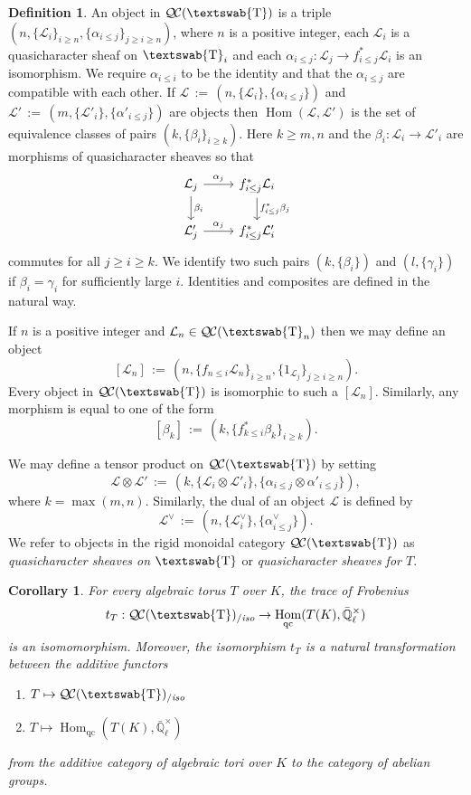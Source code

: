 \documentclass[11pt]{amsart}
\newcommand{\mathswab}[1]{\operatorname{\textswab{#1}}}
\theoremstyle{plain}
\newtheorem{corollary}[theorem]{Corollary}
\theoremstyle{definition}
\newtheorem{definition}[theorem]{Definition}
\theoremstyle{remark}
\newcommand{\EE}{\mathbb{\bar Q}_\ell}
\newcommand{\EEx}{\EE^\times}
\DeclareMathOperator{\Hom}{Hom}
\newcommand{\ceq}{{\, :=\, }}
\newcommand{\GN}[1]{\mathswab{#1}}
\newcommand{\qcs}[1]{{\mathcal{#1}}}
\newcommand{\QC}{{\mathcal{Q\hskip-0.8pt C}}}
\newcommand{\QCiso}[1]{\QC(#1)_{/\textit{iso}}}
\newcommand{\trFrob}[1]{t_{#1}}
\begin{document}
\begin{definition}\label{def:catGN}
An object in $\QC(\GN{T})$ is a triple $(n, \{\qcs{L}_i\}_{i \ge n}, \{\alpha_{i \le j}\}_{j \ge i \ge n})$, where $n$
is a positive integer, each $\qcs{L}_i$ is a quasicharacter sheaf on $\GN{T}_i$ and each
$\alpha_{i \le j} : \qcs{L}_j \to f^*_{i \le j} \qcs{L}_i$ is an isomorphism.  We require $\alpha_{i \le i}$ to be
the identity and that the $\alpha_{i \le j}$ are compatible with each other.  If $\qcs{L} \ceq (n, \{\qcs{L}_i\}, \{\alpha_{i \le j}\})$
and $\qcs{L}' \ceq (m, \{\qcs{L}'_i\}, \{\alpha'_{i \le j}\})$ are objects then $\Hom(\qcs{L}, \qcs{L}')$ is the set
of equivalence classes of pairs $(k, \{\beta_i\}_{i \ge k})$.  Here $k \ge m, n$ and the $\beta_i : \qcs{L}_i \to \qcs{L}'_i$ are
morphisms of quasicharacter sheaves so that
\[
\begin{tikzcd}
\qcs{L}_j \rar{\alpha_j} \dar{\beta_i} & f^*_{i \le j} \qcs{L}_i \dar{f_{i \le j}^*\beta_j} \\
\qcs{L}'_j \rar{\alpha_j} & f^*_{i \le j} \qcs{L}'_i
\end{tikzcd}
\]
commutes for all $j \ge i \ge k$.  We identify two such pairs $(k, \{\beta_i\})$ and $(l, \{\gamma_i\})$ if $\beta_i = \gamma_i$
for sufficiently large $i$.  Identities and composites are defined in the natural way.

If $n$ is a positive integer and $\qcs{L}_n \in \QC(\GN{T}_n)$ then we may define an object
\[
[\qcs{L}_n] \ceq (n, \{f_{n \le i} \qcs{L}_n\}_{i \ge n}, \{1_{\qcs{L}_j}\}_{j \ge i \ge n}).
\]
Every object in $\QC(\GN{T})$ is isomorphic to such a $[\qcs{L}_n]$.  Similarly, any morphism is equal to one of the form
\[
[\beta_k] \ceq (k, \{f_{k \le i}^* \beta_k\}_{i \ge k}).
\]

We may define a tensor product on $\QC(\GN{T})$ by setting
\[
 \qcs{L} \otimes \qcs{L}' \ceq (k, \{\qcs{L}_i \otimes \qcs{L}'_i\}, \{\alpha_{i \le j} \otimes \alpha'_{i \le j}\}),
\]
where $k = \max(m, n)$.
Similarly, the dual of an object $\qcs{L}$ is defined by 
\[
\qcs{L}^\vee \ceq (n, \{\qcs{L}_i^\vee\}, \{ \alpha_{i \le j}^\vee \}).
\]
We refer to objects in the rigid monoidal category 
$\QC(\GN{T})$ as \emph{quasicharacter sheaves on $\GN{T}$} 
or \emph{quasicharacter sheaves for $T$}.
\end{definition}

\begin{corollary}\label{cor:application}
For every algebraic torus $T$ over $K$, the trace of Frobenius 
  \[
\trFrob{T}:  \QCiso{\GN{T}} \to \Hom_{\text{qc}}(T(K),\EEx)
  \]
is an isomomorphism. 
Moreover, the isomorphism $\trFrob{T}$ is a natural transformation 
between the additive functors
\begin{enumerate}
\item[$F_{\QC}$:] $T \mapsto \QCiso{\GN{T}}$
\item[$F_{\text{qc}}$:] $T \mapsto \Hom_{\text{qc}}(T(K),\EEx)$
\end{enumerate}
from the additive category of algebraic tori over $K$ to the category of abelian groups.
\end{corollary}
\end{document}

